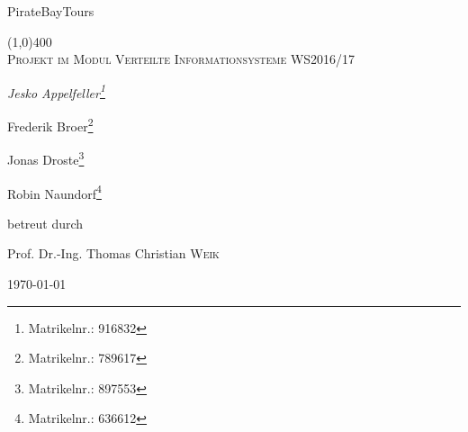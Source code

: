\documentclass[12pt,a4paper,ngerman,english]{report}
\begin{document}
\begin{titlepage}
\begin{center}	
	\Huge{PirateBayTours}
	
	\line(1,0){400} \\
	\textsc{\Large Projekt im Modul Verteilte Informationsysteme WS2016/17}\\
	[8cm]

	{\Large\itshape Jesko Appelfeller\footnote{Matrikelnr.: 916832} \par Frederik Broer\footnote{Matrikelnr.: 789617} \par Jonas Droste\footnote{Matrikelnr.: 897553} \par Robin Naundorf\footnote{Matrikelnr.: 636612} \par }
	\vfill

	\large{betreut durch\par
		Prof. Dr.-Ing. Thomas Christian \textsc{Weik}}

	\vfill
	{\large \today\par}

\end{center}
\end{titlepage}
\end{document}
